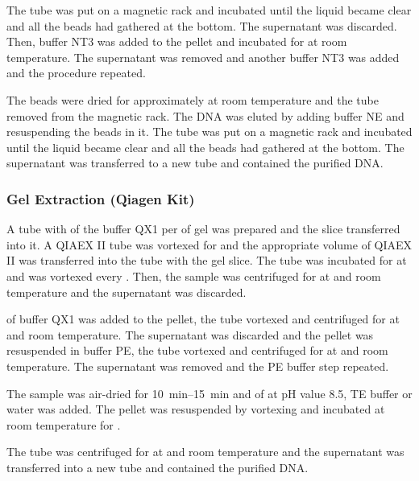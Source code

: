 The tube was put on a magnetic rack and incubated until the liquid became clear and all the beads had gathered at the bottom. The supernatant was discarded. Then,  buffer NT3 was added to the pellet and incubated for  at room temperature. The supernatant was removed and another  buffer NT3 was added and the procedure repeated.

The beads were dried for approximately  at room temperature and the tube removed from the magnetic rack. The DNA was eluted by adding  buffer NE and resuspending the beads in it. The tube was put on a magnetic rack and incubated until the liquid became clear and all the beads had gathered at the bottom. The supernatant was transferred to a new tube and contained the purified DNA.

\subsubsection{Gel Extraction (Qiagen Kit)\label{subsubsec-gel-ex-qiagen}}
A tube with  of the buffer QX1 per  of gel was prepared and the slice transferred into it. A QIAEX II tube was vortexed for  and the appropriate volume of QIAEX II was transferred into the tube with the gel slice. The tube was incubated for  at  and was vortexed every . Then, the sample was centrifuged for  at  and room temperature and the supernatant was discarded.

 of buffer QX1 was added to the pellet, the tube vortexed and centrifuged for  at  and room temperature. The supernatant was discarded and the pellet was resuspended in  buffer PE, the tube vortexed and centrifuged for  at  and room temperature. The supernatant was removed and the PE buffer step repeated.

The sample was air-dried for \SIrange{10}{15}{\minute} and  of   at pH value \num{8.5}, TE buffer or water was added. The pellet was resuspended by vortexing and incubated at room temperature for .

The tube was centrifuged for  at  and room temperature and the supernatant was transferred into a new tube and contained the purified DNA.

